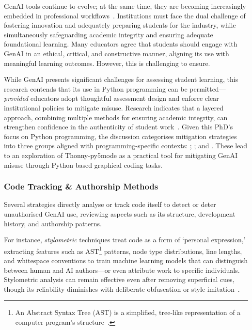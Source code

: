 GenAI tools continue to evolve; at the same time, they are becoming increasingly embedded in professional workflows~\cite{gao_research_2024, gillespie_trust_2023}. Institutions must face the dual challenge of fostering innovation and adequately preparing students for the industry, while simultaneously safeguarding academic integrity and ensuring adequate foundational learning. Many educators agree that students should engage with GenAI in an ethical, critical, and constructive manner, aligning its use with meaningful learning outcomes. However, this is challenging to ensure.

While GenAI presents significant challenges for assessing student learning, this research contends that its use in Python programming can be permitted---\textit{provided} educators adopt thoughtful assessment design and enforce clear institutional policies to mitigate misuse. Research indicates that a layered approach, combining multiple methods for ensuring academic integrity, can strengthen confidence in the authenticity of student work~\cite{mahon_guidelines_2024}. Given this PhD's focus on Python programming, the discussion categorises mitigation strategies into three groups aligned with programming-specific contexts: \textit{}; \textit{}; and \textit{}. These lead to an exploration of Thonny-py5mode as a practical tool for mitigating GenAI misuse through Python-based graphical coding tasks.

\subsubsection{Code Tracking \& Authorship Methods}
\label{sec:code-tracking-&-authorship-methods}

Several strategies directly analyse or track code itself to detect or deter unauthorised GenAI use, reviewing aspects such as its structure, development history, and authorship patterns. 

For instance, \textit{stylometric} techniques treat code as a form of `personal expression,' extracting features such as AST\footnote{An Abstract Syntax Tree (AST) is a simplified, tree-like representation of a computer program's structure~\cite{scott_programming_2016}.} patterns, node type distributions, line lengths, and whitespace conventions to train machine learning models that can distinguish between human and AI authors---or even attribute work to specific individuals. Stylometric analysis can remain effective even after removing superficial cues, though its reliability diminishes with deliberate obfuscation or style imitation~\cite{gurioli_is_2024, idialu_whodunit_2024}. 

